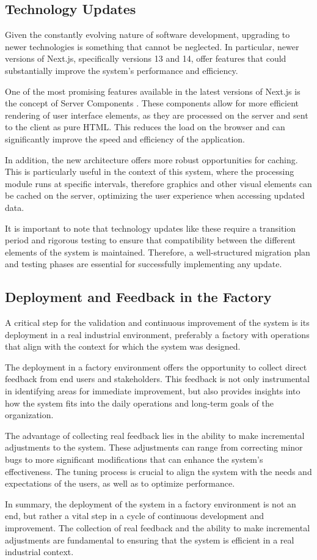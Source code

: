 \subsection{Technology Updates}
Given the constantly evolving nature of software development, upgrading to newer technologies is something that cannot be neglected. In particular, newer versions of Next.js, specifically versions 13 and 14, offer features that could substantially improve the system's performance and efficiency.

One of the most promising features available in the latest versions of Next.js is the concept of Server Components \cite{nextjsServerComponents}. These components allow for more efficient rendering of user interface elements, as they are processed on the server and sent to the client as pure HTML. This reduces the load on the browser and can significantly improve the speed and efficiency of the application.

In addition, the new architecture offers more robust opportunities for caching. This is particularly useful in the context of this system, where the processing module runs at specific intervals, therefore graphics and other visual elements can be cached on the server, optimizing the user experience when accessing updated data.

It is important to note that technology updates like these require a transition period and rigorous testing to ensure that compatibility between the different elements of the system is maintained. Therefore, a well-structured migration plan and testing phases are essential for successfully implementing any update.


\subsection{Deployment and Feedback in the Factory}

A critical step for the validation and continuous improvement of the system is its deployment in a real industrial environment, preferably a factory with operations that align with the context for which the system was designed.

The deployment in a factory environment offers the opportunity to collect direct feedback from end users and stakeholders. This feedback is not only instrumental in identifying areas for immediate improvement, but also provides insights into how the system fits into the daily operations and long-term goals of the organization.

The advantage of collecting real feedback lies in the ability to make incremental adjustments to the system. These adjustments can range from correcting minor bugs to more significant modifications that can enhance the system's effectiveness. The tuning process is crucial to align the system with the needs and expectations of the users, as well as to optimize performance.


In summary, the deployment of the system in a factory environment is not an end, but rather a vital step in a cycle of continuous development and improvement. The collection of real feedback and the ability to make incremental adjustments are fundamental to ensuring that the system is efficient in a real industrial context.